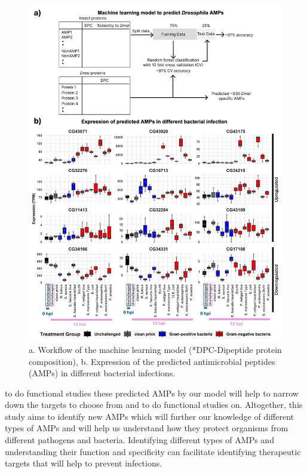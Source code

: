 \documentclass[letterpaper,11pt]{article}
\begin{document}
\begin{figure}[H]
    \centering
    \includegraphics[width=1\textwidth]{figures/figure1.jpg}
    \caption{a. Workflow of the machine learning model (*DPC-Dipeptide protein composition), b. Expression of the predicted antimicrobial peptides (AMPs) in different bacterial infections.}
    \label{fig:figure1}
\end{figure}

\noindent to do functional studies these predicted AMPs by our model will help to narrow down the targets to choose from and to do functional studies on. Altogether, this study aims to identify new AMPs which will further our knowledge of different types of AMPs and will help us understand how they protect organisms from different pathogens and bacteria. Identifying different types of AMPs and understanding their function and specificity can facilitate identifying therapeutic targets that will help to prevent infections.
\end{document}
